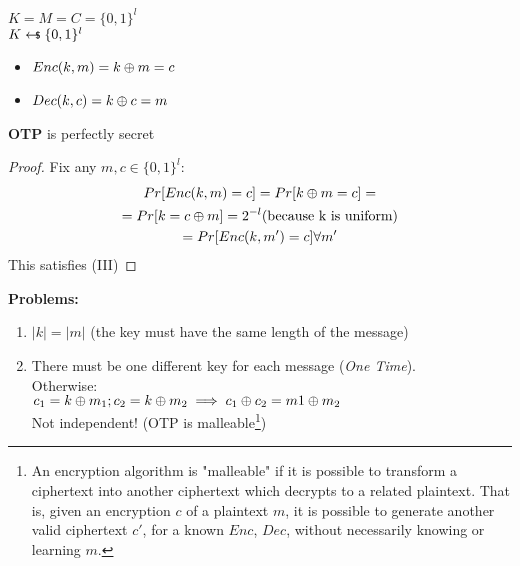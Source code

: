 $K=M=C=\{0,1\}^l$\\
$K\pickUAR \{0,1\}^l$
\begin{itemize}
    \item $Enc(k,m)=k\oplus m=c$
    \item $Dec(k,c)=k\oplus c=m$
\end{itemize}
\begin{theorem}
    \textbf{OTP} is perfectly secret
\end{theorem}
\begin{proof}
    Fix any $m,c \in \{0,1\}^l$:
    \begin{gather*}
        Pr[Enc(k,m)=c]=Pr[k\oplus m=c]=\\
        =Pr[k=c\oplus m]=2^{-l} \text{(because k is uniform)}\\
        =Pr[Enc(k,m')=c] \forall m'    
    \end{gather*}
    This satisfies (III)
\end{proof}

\textbf{Problems:}
\begin{enumerate}
    \item $|k|=|m|$ (the key must have the same length of the message)
    \item There must be one different key for each message (\textit{One Time}).\\Otherwise:\\
    $c_1=k\oplus m_1; c_2=k \oplus m_2 \implies c_1\oplus c_2=m1\oplus m_2$\\
    Not independent! (OTP is malleable\footnote{An encryption algorithm is "malleable" if it is possible to transform a ciphertext into another ciphertext which decrypts to a related plaintext. That is, given an encryption $c$ of a plaintext $m$, it is possible to generate another valid ciphertext $c'$, for a known $Enc$, $Dec$, without necessarily knowing or learning $m$. })
\end{enumerate}

